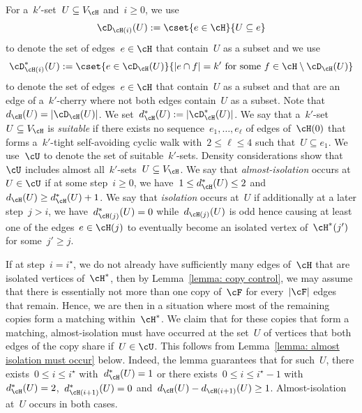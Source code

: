 \documentclass[11pt]{amsart}
\DeclarePairedDelimiter{\abs}{\lvert}{\rvert}
\newcommand{\stforsome}{\text{ for some }}
\theoremstyle{definition}
\numberwithin{equation}{section}
\begin{document}
	For a~$k'$-set~$U\subseteq V_\cH$ and~$i\geq 0$, we 
	use
	\begin{equation*}
		\cD_{\cH(i)}(U):=\cset{ e\in\cH }{ U\subseteq e }
	\end{equation*}
	to denote the set of edges~$e\in\cH$ that contain~$U$ as a subset and we use
	\begin{equation*}
		\cD_{\cH(i)}^*(U):=\cset{ e\in\cD_{\cH}(U) }{ \abs{e\cap f}=k' \stforsome f\in\cH\setminus \cD_{\cH}(U) }
	\end{equation*}
	to denote the set of edges~$e\in\cH$ that contain~$U$ as a subset and that are an edge of a~$k'$-cherry where not both edges contain~$U$ as a subset.
	Note that~$d_{\cH}(U)=\abs{\cD_\cH(U)}$.
	We set~$d_{\cH}^*(U):=\abs{\cD_\cH^*(U)}$.
	We say that a~$k'$-set~$U\subseteq V_\cH$ is \emph{suitable} if there exists no sequence~$e_1,\ldots,e_\ell$ of edges of~$\cH(0)$ that forms a~$k'$-tight self-avoiding cyclic walk with~$2\leq \ell\leq 4$ such that~$U\subseteq e_1$.
	We use~$\cU$ to denote the set of suitable~$k'$-sets.
	Density considerations show that~$\cU$ includes almost all~$k'$-sets~$U\subseteq V_\cH$.
	We say that \emph{almost-isolation} occurs at~$U\in\cU$ if at some step~$i\geq 0$, we have~$1\leq d^*_{\cH}(U)\leq 2$ and~$d_{\cH}(U)\geq d^*_{\cH}(U)+1$.
	We say that \emph{isolation} occurs at~$U$ if additionally at a later step~$j> i$, we have~$d^*_{\cH(j)}(U)=0$ while~$d_{\cH(j)}(U)$ is odd hence causing at least one of the edges~$e\in\cH(j)$ to eventually become an isolated vertex of~$\cH^*(j')$ for some~$j'\geq j$.
	
	If at step~$i=i^\star$, we do not already have sufficiently many edges of~$\cH$ that are isolated vertices of~$\cH^*$, then by Lemma~\ref{lemma: copy control}, we may assume that there is essentially not more than one copy of~$\cF$ for every~$\abs{\cF}$ edges that remain.
	Hence, we are then in a situation where most of the remaining copies form a matching within~$\cH^*$.
	We claim that for these copies that form a matching, almost-isolation must have occurred at the set~$U$ of vertices that both edges of the copy share if~$U\in\cU$.
	This follows from Lemma~\ref{lemma: almost isolation must occur} below.
	Indeed, the lemma guarantees that for such~$U$, there exists~$0\leq i\leq i^\star$ with~$d^*_{\cH}(U)=1$ or there exists~$0\leq i\leq i^\star-1$ with~$d^*_{\cH}(U)=2$,~$d^*_{\cH(i+1)}(U)=0$ and~$d_{\cH}(U)-d_{\cH(i+1)}(U)\geq 1$.
	Almost-isolation at~$U$ occurs in both cases.
	
\end{document}
